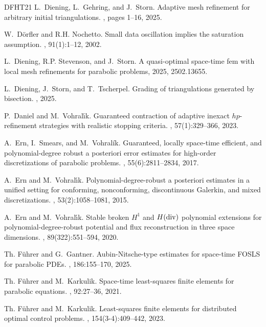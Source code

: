 \documentclass{amsart}
\numberwithin{equation}{section}
\newcommand{\1}{\mathbb 1}
\newcommand{\uumlaut}{{\"u}}
\begin{document}
\begin{thebibliography}{DFHT21}
L.~Diening, L.~Gehring, and J.~Storn.
\newblock Adaptive mesh refinement for arbitrary initial triangulations.
, pages 1--16, 2025.

W.~D\"{o}rfler and R.H. Nochetto.
\newblock Small data oscillation implies the saturation assumption.
, 91(1):1--12, 2002.

L.~Diening, R.P. Stevenson, and J.~Storn.
\newblock A quasi-optimal space-time fem with local mesh refinements for
  parabolic problems, 2025, 2502.13655.

L.~Diening, J.~Storn, and T.~Tscherpel.
\newblock Grading of triangulations generated by bisection.
, 2025.

P.~Daniel and M.~Vohral\'{\i}k.
\newblock Guaranteed contraction of adaptive inexact {$hp$}-refinement
  strategies with realistic stopping criteria.
, 57(1):329--366, 2023.

A.~Ern, I.~Smears, and M.~Vohral\'{i}k.
\newblock Guaranteed, locally space-time efficient, and polynomial-degree
  robust a posteriori error estimates for high-order discretizations of
  parabolic problems.
, 55(6):2811--2834, 2017.

A.~Ern and M.~Vohral{\'{\i}}k.
\newblock Polynomial-degree-robust a posteriori estimates in a unified setting
  for conforming, nonconforming, discontinuous {G}alerkin, and mixed
  discretizations.
, 53(2):1058--1081, 2015.

A.~Ern and M.~Vohral\'{\i}k.
\newblock Stable broken {$H^1$} and {$H({\rm div})$} polynomial extensions for
  polynomial-degree-robust potential and flux reconstruction in three space
  dimensions.
, 89(322):551--594, 2020.

Th. F\"{u}hrer and G.~Gantner.
\newblock Aubin-{N}itsche-type estimates for space-time {FOSLS} for parabolic
  {PDE}s.
, 186:155--170, 2025.

Th. F{\uumlaut}hrer and M.~Karkulik.
\newblock Space-time least-squares finite elements for parabolic equations.
, 92:27--36, 2021.

Th. F{\uumlaut}hrer and M.~Karkulik.
\newblock Least-squares finite elements for distributed optimal control
  problems.
, 154(3-4):409--442, 2023.


\end{thebibliography}
\end{document}
